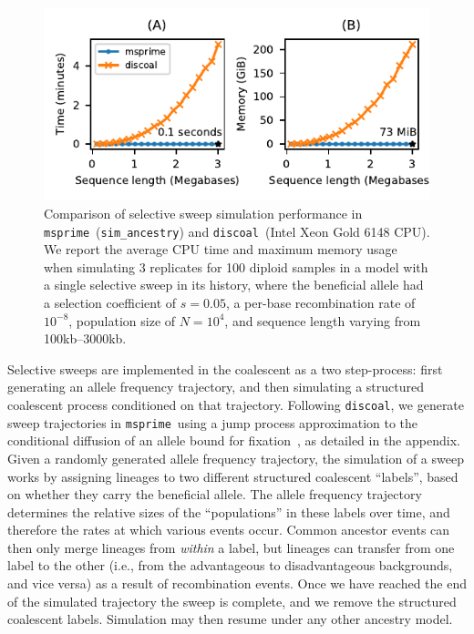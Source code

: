\documentclass[9pt,twocolumn,twoside,lineno]{gsajnl}
\newcommand{\msprime}[0]{\texttt{msprime}}
\newcommand{\discoal}[0]{\texttt{discoal}}
\begin{document}
\begin{figure}
\begin{center}
\includegraphics{figures/sweeps-perf}
\end{center}
\caption{\label{fig-selection-perf}Comparison of selective sweep simulation
performance in \msprime\ (\texttt{sim\_ancestry}) and \discoal\ (Intel Xeon Gold 6148 CPU).
We report the average CPU time and maximum memory usage when simulating 3
replicates for 100 diploid samples in a model
with a single selective sweep in its history, where the beneficial
allele had a selection coefficient of $s=0.05$,
a per-base recombination rate of $10^{-8}$, population size of $N=10^4$,
and sequence length varying from 100kb--3000kb.}
\end{figure}

Selective sweeps are implemented in the coalescent as a two
step-process: first generating an allele frequency trajectory,
and then simulating a structured coalescent process conditioned
on that trajectory.
Following \discoal, we generate sweep trajectories in \msprime\ using a
jump process approximation to the conditional
diffusion of an allele bound for
fixation~\citep{coop2004ancestral}, as detailed in the 
appendix. Given a randomly generated allele frequency trajectory,
the simulation of a sweep works by assigning lineages to
two different structured coalescent ``labels'', based on
whether they carry the beneficial allele.
The allele frequency trajectory determines the relative sizes
of the ``populations'' in these labels over time, and therefore
the rates at which various events occur.
Common ancestor events can then only merge lineages from \emph{within}
a label, but lineages can transfer from one label to the other
(i.e., from the advantageous to disadvantageous backgrounds,
and vice versa) as a result of recombination events.
Once we have reached the end of the simulated trajectory the sweep
is complete, and we remove the structured coalescent labels.
Simulation may then resume under any other ancestry model.
\end{document}
